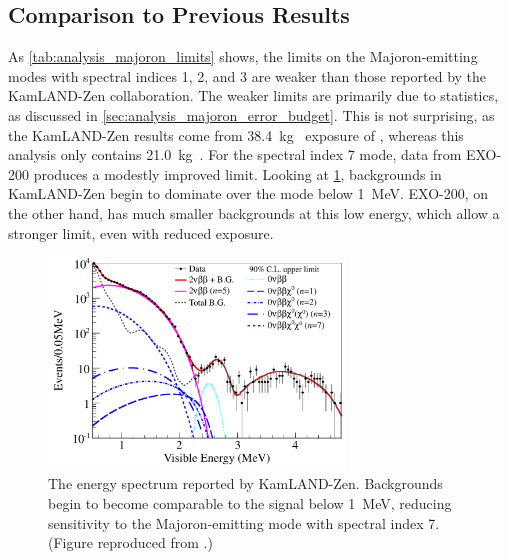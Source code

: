 \documentclass[herrin-thesis.tex]{subfiles}
\begin{document}
\subsection{Comparison to Previous Results}
As \cref{tab:analysis_majoron_limits} shows, the limits on the Majoron-emitting modes with spectral indices 1, 2, and 3 are weaker than those reported by the KamLAND-Zen collaboration. The weaker limits are primarily due to statistics, as discussed in \cref{sec:analysis_majoron_error_budget}. This is not surprising, as the KamLAND-Zen results come from \SI{38.4}{\kg\year} exposure of , whereas this analysis only contains \SI{21.0}{\kg\year}. For the spectral index 7 mode, data from EXO-200 produces a modestly improved limit. Looking at \cref{fig:analysis_kamlandzen_spectrum}, backgrounds in KamLAND-Zen begin to dominate over the \twonu{} mode below \SI{1}{\MeV}. EXO-200, on the other hand, has much smaller backgrounds at this low energy, which allow a stronger limit, even with reduced exposure.

\begin{figure}[htbp]
\centering
\includegraphics[width=0.7\textwidth]{./plots/analysis_kamlandzen_spectrum.pdf}
\caption[KamLAND-Zen spectrum with limits for Majoron-emitting modes]{The energy spectrum reported by KamLAND-Zen. Backgrounds begin to become comparable to the \twonu{} signal below \SI{1}{\MeV}, reducing sensitivity to the Majoron-emitting mode with spectral index 7. (Figure reproduced from \cite{Gando:2012fk}.)}
\label{fig:analysis_kamlandzen_spectrum}
\end{figure}
\end{document}
